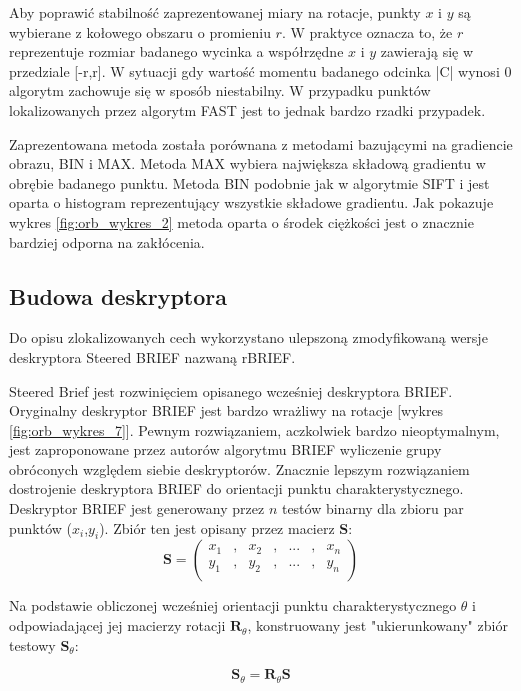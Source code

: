 Aby poprawić stabilność zaprezentowanej miary na rotacje, punkty $x$ i $y$ są wybierane z kołowego obszaru o promieniu $r$. W praktyce oznacza to, że $r$ reprezentuje rozmiar badanego wycinka a współrzędne $x$ i $y$ zawierają się w przedziale [-r,r]. W sytuacji gdy wartość momentu badanego odcinka |C| wynosi 0 algorytm zachowuje się w sposób niestabilny. W przypadku punktów lokalizowanych przez algorytm FAST jest to jednak bardzo rzadki przypadek.

Zaprezentowana metoda została porównana z metodami bazującymi na gradiencie obrazu, BIN i MAX. Metoda MAX wybiera największa składową gradientu w obrębie badanego punktu. Metoda BIN podobnie jak w algorytmie SIFT i jest oparta o histogram reprezentujący wszystkie składowe gradientu. Jak pokazuje wykres \ref{fig:orb_wykres_2} metoda oparta o środek ciężkości jest o znacznie bardziej odporna na zakłócenia.
\subsection{Budowa deskryptora}
Do opisu zlokalizowanych cech wykorzystano ulepszoną zmodyfikowaną wersje deskryptora Steered BRIEF nazwaną rBRIEF. 

Steered Brief jest rozwinięciem opisanego wcześniej deskryptora BRIEF. Oryginalny deskryptor BRIEF jest bardzo wrażliwy na rotacje [wykres \ref{fig:orb_wykres_7}]. Pewnym rozwiązaniem, aczkolwiek bardzo nieoptymalnym, jest zaproponowane przez autorów algorytmu BRIEF wyliczenie grupy obróconych względem siebie deskryptorów. Znacznie lepszym rozwiązaniem dostrojenie deskryptora BRIEF do orientacji punktu charakterystycznego. Deskryptor BRIEF jest generowany przez $n$ testów binarny dla zbioru par punktów ($x_i$,$y_i$). Zbiór ten jest opisany przez macierz $\textbf{S}$:
\begin{equation}
\textbf{S} = \left(\begin{array}{ccccccc}
x_1 & , & x_2 & , & ... & , & x_n \\
y_1 & , & y_2 & , & ... & , & y_n \\
\end{array}
\right)
\end{equation} 

Na podstawie obliczonej wcześniej orientacji punktu charakterystycznego $\theta$ i odpowiadającej jej macierzy rotacji $\textbf{R}_{\theta}$, konstruowany jest "ukierunkowany" zbiór testowy $\textbf{S}_{\theta}$:

\begin{equation}
\textbf{S}_\theta = \textbf{R}_\theta \textbf{S}
\end{equation}

